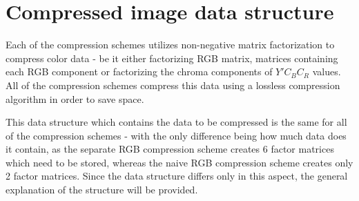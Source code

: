 \documentclass[thesis=M,english]{FITthesis}[2012/10/20]
\begin{document}
\section{Compressed image data structure}
\label{sec:data-structure}
Each of the compression schemes utilizes non-negative matrix factorization
to compress color data - be it either factorizing RGB matrix, matrices containing
each RGB component or factorizing the chroma components of $Y'C_BC_R$ values.
All of the compression schemes compress this data using a lossless compression
algorithm in order to save space.

This data structure which contains the data to be compressed is the same for all
of the compression schemes - with the only difference being how much data does
it contain, as the separate RGB compression scheme creates 6 factor matrices which
need to be stored, whereas the naive RGB compression scheme creates only 2
factor matrices. Since the data structure differs only in this aspect, the general
explanation of the structure will be provided.
\end{document}
